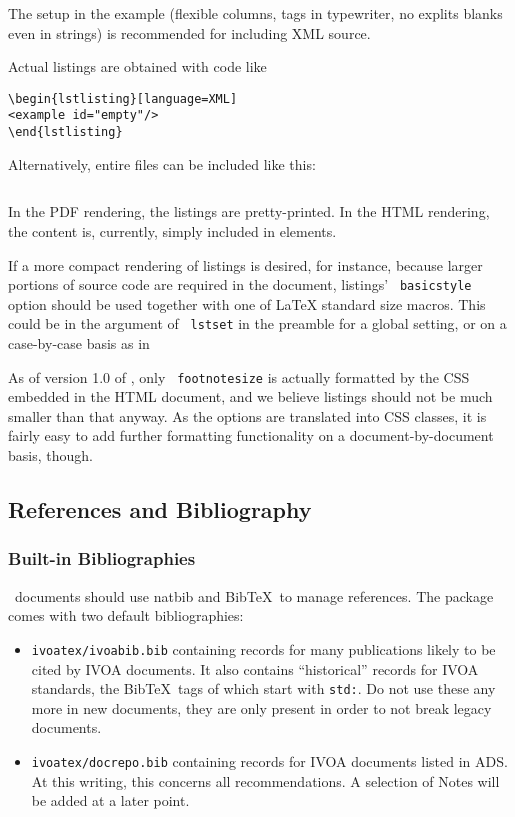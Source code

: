 \documentclass[11pt,a4paper]{ivoa}
\newcommand{\texword}[1]{\texttt{\color{texcolor} #1}}
\newcommand{\BibTeX}{BibTeX}
\begin{document}
The setup in the example (flexible columns, tags in
typewriter, no explits blanks even in strings) 
is recommended for including XML source.

Actual listings are obtained with code like
\begin{verbatim}
\begin{lstlisting}[language=XML]
<example id="empty"/>
\end{lstlisting}
\end{verbatim}
Alternatively, entire files can be included like this:
\begin{verbatim}

\end{verbatim}
In the PDF rendering, the listings are pretty-printed.  In the HTML
rendering, the content is, currently, simply included in  elements.

If a more compact rendering of listings is desired, for instance,
because larger portions of source code are required in the document,
listings' \texword{basicstyle} option should be used together with one
of LaTeX standard size macros.  This could be in the argument of
\texword{lstset} in the preamble for a global setting, or on a
case-by-case basis as in



As of version 1.0 of \ivoatex, only \texword{footnotesize} is actually
formatted by the CSS embedded in the HTML document, and we believe
listings should not be much smaller than that anyway.  As the options
are translated into CSS classes, it is fairly easy to add further
formatting functionality on a document-by-document basis, though.

\subsection{References and Bibliography}

\subsubsection{Built-in Bibliographies}
\ivoatex\ documents should use natbib and \BibTeX\ to manage references.
The package comes with two default bibliographies:

\begin{itemize}
\item \texttt{ivoatex/ivoabib.bib} containing records for many publications
likely to be cited by IVOA documents.  It also contains ``historical''
records for IVOA standards, the \BibTeX\ tags of which start with
\texttt{std:}.  Do not use these any more in new documents, they are
only present in order to not break legacy documents.
\item\texttt{ivoatex/docrepo.bib} containing records for IVOA documents
listed in ADS.  At this writing, this concerns all recommendations.  A
selection of Notes will be added at a later point.
\end{itemize}
\end{document}
